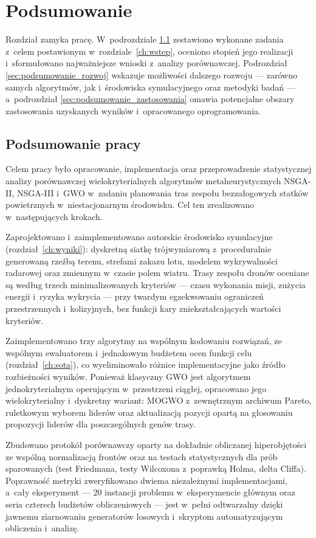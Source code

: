 \chapter{Podsumowanie}
\label{ch:podsumowanie}

Rozdział zamyka pracę. W~podrozdziale \ref{sec:podsumowanie_praca} zestawiono
wykonane zadania z~celem postawionym w~rozdziale~\ref{ch:wstep}, oceniono stopień
jego realizacji i~sformułowano najważniejsze wnioski z~analizy porównawczej.
Podrozdział \ref{sec:podsumowanie_rozwoj} wskazuje możliwości dalszego rozwoju
--- zarówno samych algorytmów, jak i~środowiska symulacyjnego oraz metodyki
badań --- a~podrozdział \ref{sec:podsumowanie_zastosowania} omawia potencjalne
obszary zastosowania uzyskanych wyników i~opracowanego oprogramowania.

\section{Podsumowanie pracy}
\label{sec:podsumowanie_praca}

Celem pracy było opracowanie, implementacja oraz przeprowadzenie statystycznej
analizy porównawczej wielokryterialnych algorytmów metaheurystycznych NSGA-II,
NSGA-III i~GWO w~zadaniu planowania tras zespołu bezzałogowych statków
powietrznych w~niestacjonarnym środowisku. Cel ten zrealizowano w~następujących
krokach.

Zaprojektowano i~zaimplementowano autorskie środowisko symulacyjne
(rozdział~\ref{ch:wyniki}): dyskretną siatkę trójwymiarową z~proceduralnie
generowaną rzeźbą terenu, strefami zakazu lotu, modelem wykrywalności radarowej
oraz zmiennym w~czasie polem wiatru. Trasy zespołu dronów oceniane są według
trzech minimalizowanych kryteriów --- czasu wykonania misji, zużycia energii
i~ryzyka wykrycia --- przy twardym egzekwowaniu ograniczeń przestrzennych
i~kolizyjnych, bez funkcji kary zniekształcających wartości kryteriów.

Zaimplementowano trzy algorytmy na wspólnym kodowaniu rozwiązań, ze wspólnym
ewaluatorem i~jednakowym budżetem ocen funkcji celu (rozdział~\ref{ch:sota}),
co wyeliminowało różnice implementacyjne jako źródło rozbieżności wyników.
Ponieważ klasyczny GWO jest algorytmem jednokryterialnym operującym w~przestrzeni
ciągłej, opracowano jego wielokryterialny i~dyskretny wariant: MOGWO z~zewnętrznym
archiwum Pareto, ruletkowym wyborem liderów oraz aktualizacją pozycji opartą na
głosowaniu propozycji liderów dla poszczególnych genów trasy.

Zbudowano protokół porównawczy oparty na dokładnie obliczanej hiperobjętości
ze wspólną normalizacją frontów oraz na testach statystycznych dla prób
sparowanych (test Friedmana, testy Wilcoxona z~poprawką Holma, delta Cliffa).
Poprawność metryki zweryfikowano dwiema niezależnymi implementacjami, a~cały
eksperyment --- 20 instancji problemu w~eksperymencie głównym oraz seria
czterech budżetów obliczeniowych --- jest w~pełni odtwarzalny dzięki jawnemu
ziarnowaniu generatorów losowych i~skryptom automatyzującym obliczenia
i~analizę.

